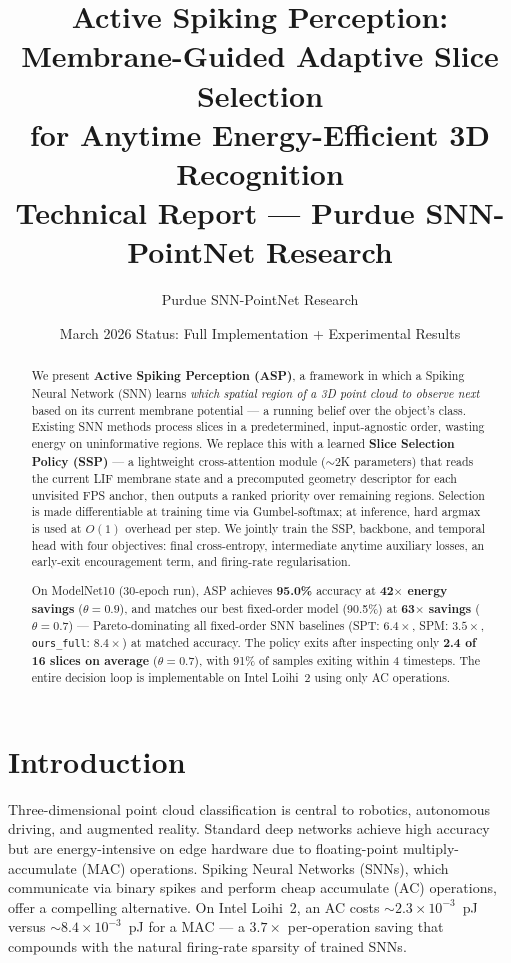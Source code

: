 \documentclass[11pt,a4paper]{article}
\title{%
  \textbf{Active Spiking Perception:}\\
  \textbf{Membrane-Guided Adaptive Slice Selection}\\
  \textbf{for Anytime Energy-Efficient 3D Recognition}\\[8pt]
  \large Technical Report --- Purdue SNN-PointNet Research
}
\author{Purdue SNN-PointNet Research}
\date{March 2026 \quad\textbullet\quad Status: Full Implementation + Experimental Results}
\begin{document}
\maketitle

\begin{abstract}
We present \textbf{Active Spiking Perception (ASP)}, a framework in which a
Spiking Neural Network (SNN) learns \emph{which spatial region of a 3D point
cloud to observe next} based on its current membrane potential --- a running
belief over the object's class. Existing SNN methods process slices in a
predetermined, input-agnostic order, wasting energy on uninformative regions.
We replace this with a learned \textbf{Slice Selection Policy (SSP)} --- a
lightweight cross-attention module (${\sim}$2K parameters) that reads the
current LIF membrane state and a precomputed geometry descriptor for each
unvisited FPS anchor, then outputs a ranked priority over remaining regions.
Selection is made differentiable at training time via Gumbel-softmax; at
inference, hard argmax is used at $O(1)$ overhead per step. We jointly train
the SSP, backbone, and temporal head with four objectives: final
cross-entropy, intermediate anytime auxiliary losses, an early-exit
encouragement term, and firing-rate regularisation.

On ModelNet10 (30-epoch run), ASP achieves \textbf{95.0\%} accuracy at
\textbf{42$\times$ energy savings} ($\theta{=}0.9$), and matches our best
fixed-order model (90.5\%) at \textbf{63$\times$ savings} ($\theta{=}0.7$) ---
Pareto-dominating all fixed-order SNN baselines (SPT: $6.4\times$,
SPM: $3.5\times$, \texttt{ours\_full}: $8.4\times$) at matched accuracy. The
policy exits after inspecting only \textbf{2.4 of 16 slices on average}
($\theta{=}0.7$), with 91\% of samples exiting within 4 timesteps. The entire
decision loop is implementable on Intel Loihi~2 using only AC operations.
\end{abstract}

\tableofcontents
\clearpage

\section{Introduction}

Three-dimensional point cloud classification is central to robotics, autonomous
driving, and augmented reality. Standard deep networks achieve high accuracy but
are energy-intensive on edge hardware due to floating-point multiply-accumulate
(MAC) operations. Spiking Neural Networks (SNNs), which communicate via binary
spikes and perform cheap accumulate (AC) operations, offer a compelling
alternative. On Intel Loihi~2, an AC costs ${\sim}2.3 \times 10^{-3}$~pJ versus
${\sim}8.4 \times 10^{-3}$~pJ for a MAC --- a $3.7\times$ per-operation saving
that compounds with the natural firing-rate sparsity of trained SNNs.
\end{document}
